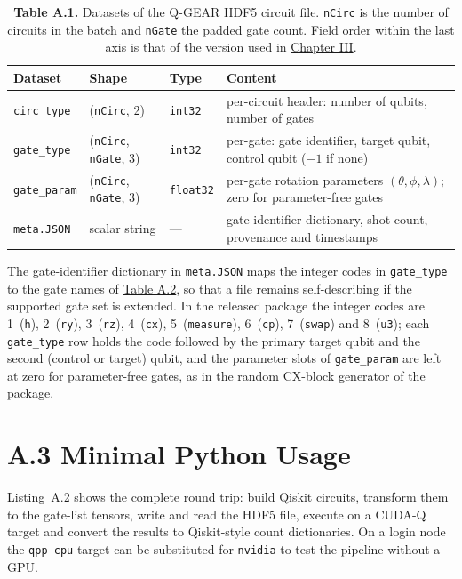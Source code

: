 \documentclass{report}
\theoremstyle{plain}
\theoremstyle{definition}
\theoremstyle{remark}
\begin{document}
\begin{table}[htbp]
\caption{\textbf{Table A.1.} Datasets of the Q-GEAR HDF5 circuit file. \texttt{nCirc} is the number of circuits in the batch and \texttt{nGate} the padded gate count. Field order within the last axis is that of the version used in \hyperref[ch:qgear]{Chapter III}.}
\label{tab:appqgear:hdf5}
 
  \footnotesize
\begin{tabular}{llll}
\toprule
Dataset & Shape & Type & Content \\
\midrule
\texttt{circ\_type} & (\texttt{nCirc}, 2) & \texttt{int32} & per-circuit header: number of qubits, number of gates \\
\texttt{gate\_type} & (\texttt{nCirc}, \texttt{nGate}, 3) & \texttt{int32} & per-gate: gate identifier, target qubit, control qubit ($-1$ if none) \\
\texttt{gate\_param} & (\texttt{nCirc}, \texttt{nGate}, 3) & \texttt{float32} & per-gate rotation parameters $(\theta,\phi,\lambda)$; zero for parameter-free gates \\
\texttt{meta.JSON} & scalar string & --- & gate-identifier dictionary, shot count, provenance and timestamps \\
\bottomrule
\end{tabular}
 
\end{table}

The gate-identifier dictionary in \texttt{meta.JSON} maps the integer codes in \texttt{gate\_type} to the gate names of \hyperref[tab:appqgear:gates]{Table A.2}, so that a file remains self-describing if the supported gate set is extended. In the released package the integer codes are 1~(\texttt{h}), 2~(\texttt{ry}), 3~(\texttt{rz}), 4~(\texttt{cx}), 5~(\texttt{measure}), 6~(\texttt{cp}), 7~(\texttt{swap}) and 8~(\texttt{u3}); each \texttt{gate\_type} row holds the code followed by the primary target qubit and the second (control or target) qubit, and the parameter slots of \texttt{gate\_param} are left at zero for parameter-free gates, as in the random CX-block generator of the package.

\section{A.3 Minimal Python Usage}\label{sec:appqgear:python}

Listing~\hyperref[lst:appqgear:python]{A.2} shows the complete round trip: build Qiskit circuits, transform them to the gate-list tensors, write and read the HDF5 file, execute on a CUDA-Q target and convert the results to Qiskit-style count dictionaries. On a login node the \texttt{qpp-cpu} target can be substituted for \texttt{nvidia} to test the pipeline without a GPU.
\end{document}
